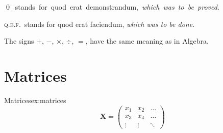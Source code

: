 \begin{comment}
\begin{tabular*}{\dentwidth}{rl@{\extracolsep{\fill}}l@{\extracolsep{0pt}}@{\dots}l}

$>$ & is (or are) greater than. & Def. & definition. \\
$<$ & is (or are) less than. & Ax. & axiom. \\
$\Bumpeq$ & is (or are) equivalent to. & Hyp. & hypothesis. \\
$\therefore$ & therefore. & Cor. & corollary. \\
$\perp$ & perpendicular. & Scho. & scholium. \\
$\perp_s$ & perpendiculars. & Ex. & exercise. \\
$\parallel$ & parallel.\qquad $\parallel_s$ parallels. & Adj. & adjacent. \\
$\angle$ & angle.\qquad $\angle_s$ angles. & Iden. & identical. \\
$\triangle$ & triangle.\qquad $\triangle_s$ triangles. & Const. & construction. \\
$\Par$ & parallelogram. & Sup. & supplementary. \\
$\Par_s$ & parallelograms. & Ext. & exterior. \\
$\odot$ & circle.\qquad $\odot_s$ circles. & Int. & interior. \\
rt. & right.\qquad  st.\ straight. & Alt. & alternate. \\
\end{tabular*}
\end{comment}

\hbox{\qed\ stands for quod erat demonstrandum, \emph{which was to be proved}.\hss}

\newcommand{\qef}{\textsc{q.e.f.}}
\qef\ stands for quod erat faciendum, \emph{which was to be done.}

The signs $+$, $-$, $\times$, $\div$, $=$, have the same meaning as in Algebra.




\section{Matrices}


\begin{texexample}{Matrices}{ex:matrices}
\[
\mathbf{X} = \left(
\begin{array}{ccc}
x_1 & x_2 & \ldots \\
x_3 & x_4 & \ldots \\
\vdots & \vdots & \ddots
\end{array} \right)
\]
\end{texexample}


